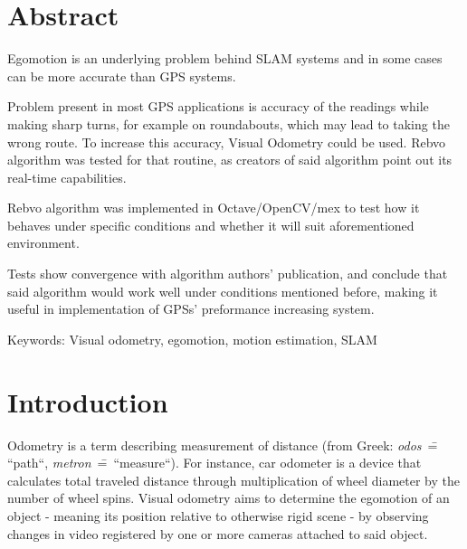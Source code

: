 \chapter*{Abstract}

Egomotion is an underlying problem behind SLAM systems and in some cases can be more accurate than GPS systems.

Problem present in most GPS applications is accuracy of the readings while making sharp turns, for example on roundabouts, which may lead to taking the wrong route. To increase this accuracy, Visual Odometry could be used. Rebvo algorithm was tested for that routine, as creators of said algorithm point out its real-time capabilities.

Rebvo algorithm was implemented in Octave/OpenCV/mex to test how it behaves under specific conditions and whether it will suit aforementioned environment.

Tests show convergence with algorithm authors' publication, and conclude that said algorithm would work well under conditions mentioned before, making it useful in implementation of GPSs' preformance increasing system.

Keywords: Visual odometry, egomotion, motion estimation, SLAM

\chapter*{Introduction}

Odometry is a term describing measurement of distance (from Greek: \textit{odos}~\==~ ``path``, \textit{metron}~\==~``measure``). For instance, car odometer is a device that calculates total traveled distance through multiplication of wheel diameter by the number of wheel spins. %
Visual odometry aims to determine the egomotion of an object - meaning its position relative to otherwise rigid scene - by observing changes in video registered by one or more cameras attached to said object.


